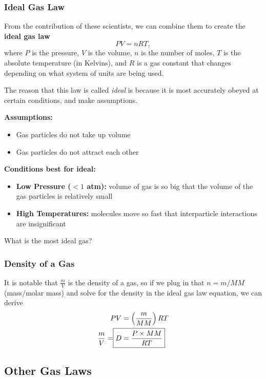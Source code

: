 \subsubsection{Ideal Gas Law}
From the contribution of these scientists, we can combine them to create the \textbf{ideal gas law}
\begin{equation}
    \boxed{PV = nRT},
\end{equation}
where $P$ is the pressure, $V$ is the volume, $n$ is the number of moles, $T$ is the absolute temperature (in Kelvins), and $R$ is a gas constant that changes depending on what system of units are being used.

The reason that this law is called \textit{ideal} is because it is most accurately obeyed at certain conditions, and make assumptions.

\noindent \textbf{Assumptions:}
\begin{itemize}
    \item Gas particles do not take up volume
    \item Gas particles do not attract each other
\end{itemize}

\noindent \textbf{Conditions best for ideal:}
\begin{itemize}
    \item \textbf{Low Pressure ($<1$ atm):} volume of gas is so big that the volume of the gas particles is relatively small
    \item \textbf{High Temperatures:} molecules move so fast that interparticle interactions are insignificant
\end{itemize}

\begin{problem}
What is the most ideal gas?
\end{problem}

\subsubsection{Density of a Gas}
It is notable that $\frac{m}{V}$ is the density of a gas, so if we plug in that $n = m/MM$ (mass/molar mass) and solve for the density in the ideal gas law equation, we can derive
\begin{align*}
    PV &= \left(\frac{m}{MM}\right)RT \\
    \frac{m}{V} = \Aboxed{D &= \frac{P \times MM}{RT}}
\end{align*}

\subsection{Other Gas Laws}
